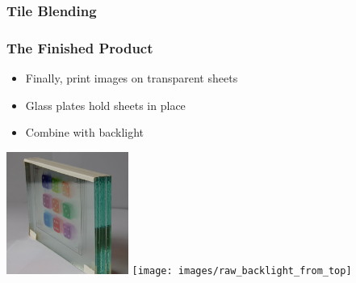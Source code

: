 \documentclass[12pt, compress]{beamer}
\begin{document}
\begin{frame}[fragile]
	\frametitle{Tile Blending}
	
	\begin{figure}
		\hspace{1cm}
	\end{figure}
\end{frame}

\begin{frame}[fragile]
	\frametitle{The Finished Product}
	
	\begin{itemize}
		\item Finally, print images on transparent sheets
		\item Glass plates hold sheets in place
		\item Combine with backlight
	\end{itemize}
	
	\begin{center}
		\includegraphics[height=4cm]{images/glass_plates_front_view_cropped}
		\hspace{1cm}
		\texttt{[image: images/raw\_backlight\_from\_top]}
	\end{center}
\end{frame}
\end{document}
